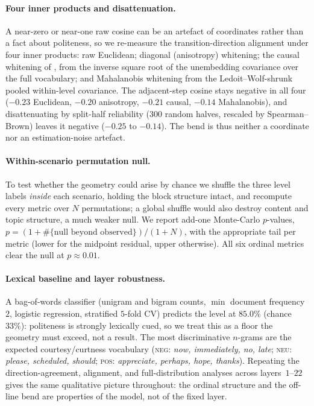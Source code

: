 \documentclass{article}
\begin{document}
\paragraph{Four inner products and disattenuation.}
A near-zero or near-one raw cosine can be an artefact of coordinates rather than
a fact about politeness, so we re-measure the transition-direction alignment
under four inner products: raw Euclidean; diagonal (anisotropy) whitening; the
causal whitening of \citet{park2024linear}, from the inverse square root of the
unembedding covariance over the full vocabulary; and Mahalanobis whitening from
the Ledoit--Wolf-shrunk pooled within-level covariance. The adjacent-step cosine
stays negative in all four ($-0.23$ Euclidean, $-0.20$ anisotropy, $-0.21$
causal, $-0.14$ Mahalanobis), and disattenuating by split-half reliability ($300$
random halves, rescaled by Spearman--Brown) leaves it negative ($-0.25$ to
$-0.14$). The bend is thus neither a coordinate nor an estimation-noise artefact.

\paragraph{Within-scenario permutation null.}
To test whether the geometry could arise by chance we shuffle the three level
labels \emph{inside} each scenario, holding the block structure intact, and
recompute every metric over $N$ permutations; a global shuffle would also destroy
content and topic structure, a much weaker null. We report add-one Monte-Carlo
$p$-values, $p=(1+\#\{\text{null beyond observed}\})/(1+N)$, with the appropriate
tail per metric (lower for the midpoint residual, upper otherwise). All six
ordinal metrics clear the null at $p\approx0.01$.

\paragraph{Lexical baseline and layer robustness.}
A bag-of-words classifier (unigram and bigram counts, $\min$ document frequency
$2$, logistic regression, stratified $5$-fold CV) predicts the level at $85.0\%$
(chance $33\%$): politeness is strongly lexically cued, so we treat this as a
floor the geometry must exceed, not a result. The most discriminative $n$-grams
are the expected courtesy/curtness vocabulary (\textsc{neg}: \emph{now,
immediately, no, late}; \textsc{neu}: \emph{please, scheduled, should};
\textsc{pos}: \emph{appreciate, perhaps, hope, thanks}). Repeating the
direction-agreement, alignment, and full-distribution analyses across
layers~$1$--$22$ gives the same qualitative picture throughout: the ordinal
structure and the off-line bend are properties of the model, not of the fixed
layer.
\end{document}
